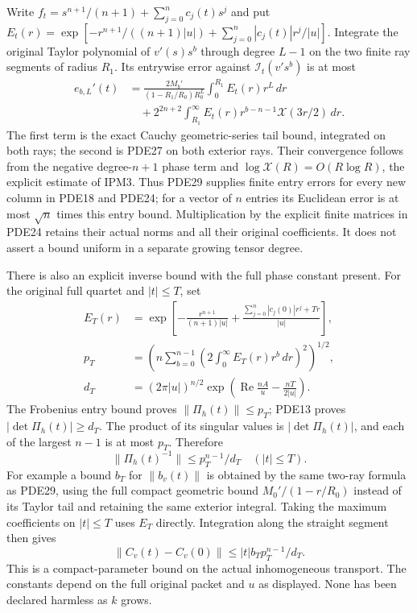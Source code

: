 Write $f_t=s^{n+1}/(n+1)+\sum_{j=0}^n c_j(t)s^j$ and put
$E_t(r)=\exp[-r^{n+1}/((n+1)|u|)+\sum_{j=0}^n|c_j(t)|r^j/|u|]$.
Integrate the original Taylor polynomial of $v'(s)s^b$ through degree
$L-1$ on the two finite ray segments of radius $R_1$. Its entrywise
error against $\mathcal I_t(v's^b)$ is at most
\[
 \begin{split}
 e_{b,L}'(t)
 &=\frac{2M_b'}{(1-R_1/R_0)R_0^L}
                  \int_0^{R_1}E_t(r)r^L\,dr\\
 &\quad+2^{2n+2}\int_{R_1}^\infty
             E_t(r)r^{b-n-1}\mathcal X(3r/2)\,dr .
 \end{split}
 \tag{PDE29}
\]
The first term is the exact Cauchy geometric-series tail bound,
integrated on both rays; the second is PDE27 on both exterior rays.
Their convergence follows from the negative degree-$n+1$ phase term
and $\log\mathcal X(R)=O(R\log R)$, the explicit estimate of IPM3.
Thus PDE29 supplies finite entry errors for every new column in
PDE18 and PDE24; for a vector of $n$ entries its Euclidean error is
at most $\sqrt n$ times this entry bound. Multiplication by the
explicit finite matrices in PDE24 retains their actual norms and
all their original coefficients. It does not assert a bound uniform
in a separate growing tensor degree.

There is also an explicit inverse bound with the full phase constant
present. For the original full quartet and $|t|\leq T$, set
\[
 \begin{split}
 E_T(r)&=\exp\left[-\frac{r^{n+1}}{(n+1)|u|}
            +\frac{\sum_{j=0}^n|c_j(0)|r^j+Tr}{|u|}\right],\\
 p_T&=\left(n\sum_{b=0}^{n-1}
                      \left(2\int_0^\infty E_T(r)r^b\,dr\right)^2
                \right)^{1/2},\\
 d_T&=(2\pi|u|)^{n/2}
                 \exp\left(\operatorname{Re}\frac{nA}{u}
                                      -\frac{nT}{2|u|}\right).
 \end{split}
 \tag{PDE30}
\]
The Frobenius entry bound proves $\|\Pi_h(t)\|\leq p_T$; PDE13
proves $|\det\Pi_h(t)|\geq d_T$. The product of its singular values
is $|\det\Pi_h(t)|$, and each of the largest $n-1$ is at most
$p_T$. Therefore
\[
 \|\Pi_h(t)^{-1}\|\leq p_T^{n-1}/d_T\quad(|t|\leq T).
 \tag{PDE31}
\]
For example a bound $b_T$ for $\|b_v(t)\|$ is obtained by the same
two-ray formula as PDE29, using the full compact geometric bound
$M_0'/(1-r/R_0)$ instead of its Taylor tail and retaining the same
exterior integral. Taking the maximum coefficients on $|t|\leq T$
uses $E_T$ directly. Integration along the straight segment then gives
\[
 \|C_v(t)-C_v(0)\|
            \leq |t|b_T p_T^{n-1}/d_T.
 \tag{PDE32}
\]
This is a compact-parameter bound on the actual inhomogeneous
transport. The constants depend on the full original packet and
$u$ as displayed. None has been declared harmless as $k$ grows.

